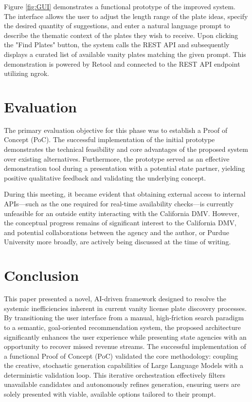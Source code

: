 \documentclass{article} %
\begin{document}
Figure \ref{fig:GUI} demonstrates a functional prototype of the improved system. The interface allows the user to adjust the length range of the plate ideas, specify the desired quantity of suggestions, and enter a natural language prompt to describe the thematic context of the plates they wish to receive. Upon clicking the "Find Plates" button, the system calls the REST API and subsequently displays a curated list of available vanity plates matching the given prompt. This demonstration is powered by Retool and connected to the REST API endpoint utilizing ngrok.

\section{Evaluation}

The primary evaluation objective for this phase was to establish a Proof of Concept (PoC). The successful implementation of the initial prototype demonstrates the technical feasibility and core advantages of the proposed system over existing alternatives. Furthermore, the prototype served as an effective demonstration tool during a presentation with a potential state partner, yielding positive qualitative feedback and validating the underlying concept. 

During this meeting, it became evident that obtaining external access to internal APIs—such as the one required for real-time availability checks—is currently unfeasible for an outside entity interacting with the California DMV. However, the conceptual progress remains of significant interest to the California DMV, and potential collaborations between the agency and the author, or Purdue University more broadly, are actively being discussed at the time of writing.

\section{Conclusion}

This paper presented a novel, AI-driven framework designed to resolve the systemic inefficiencies inherent in current vanity license plate discovery processes. By transitioning the user interface from a manual, high-friction search paradigm to a semantic, goal-oriented recommendation system, the proposed architecture significantly enhances the user experience while presenting state agencies with an opportunity to recover missed revenue streams. The successful implementation of a functional Proof of Concept (PoC) validated the core methodology: coupling the creative, stochastic generation capabilities of Large Language Models with a deterministic validation loop. This iterative orchestration effectively filters unavailable candidates and autonomously refines generation, ensuring users are solely presented with viable, available options tailored to their prompt.
\end{document}
